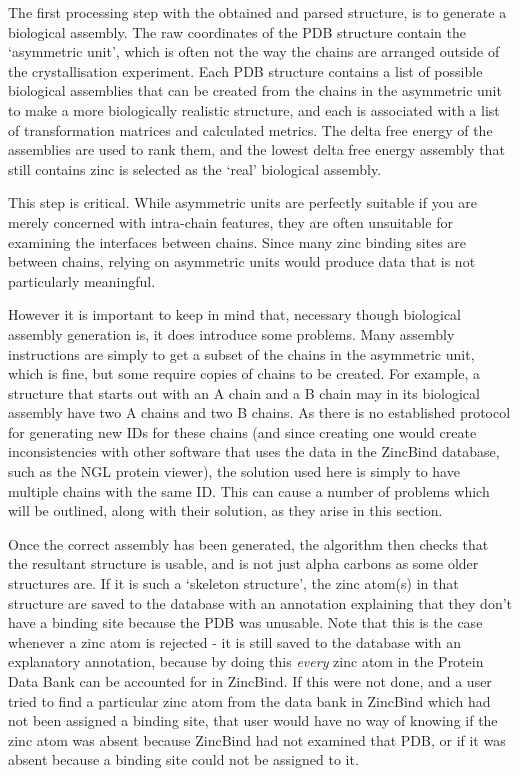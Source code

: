 The first processing step with the obtained and parsed structure, is to generate a biological assembly. The raw coordinates of the PDB structure contain the `asymmetric unit', which is often not the way the chains are arranged outside of the crystallisation experiment. Each PDB structure contains a list of possible biological assemblies that can be created from the chains in the asymmetric unit to make a more biologically realistic structure, and each is associated with a list of transformation matrices and calculated metrics. The delta free energy of the assemblies are used to rank them, and the lowest delta free energy assembly that still contains zinc is selected as the `real' biological assembly.

This step is critical. While asymmetric units are perfectly suitable if you are merely concerned with intra-chain features, they are often unsuitable for examining the interfaces between chains. Since many zinc binding sites are between chains, relying on asymmetric units would produce data that is not particularly meaningful.

However it is important to keep in mind that, necessary though biological assembly generation is, it does introduce some problems. Many assembly instructions are simply to get a subset of the chains in the asymmetric unit, which is fine, but some require copies of chains to be created. For example, a structure that starts out with an A chain and a B chain may in its biological assembly have two A chains and two B chains. As there is no established protocol for generating new IDs for these chains (and since creating one would create inconsistencies with other software that uses the data in the ZincBind database, such as the NGL protein viewer), the solution used here is simply to have multiple chains with the same ID. This can cause a number of problems which will be outlined, along with their solution, as they arise in this section.

Once the correct assembly has been generated, the algorithm then checks that the resultant structure is usable, and is not just alpha carbons as some older structures are. If it is such a `skeleton structure', the zinc atom(s) in that structure are saved to the database with an annotation explaining that they don't have a binding site because the PDB was unusable. Note that this is the case whenever a zinc atom is rejected - it is still saved to the database with an explanatory annotation, because by doing this \emph{every} zinc atom in the Protein Data Bank can be accounted for in ZincBind. If this were not done, and a user tried to find a particular zinc atom from the data bank in ZincBind which had not been assigned a binding site, that user would have no way of knowing if the zinc atom was absent because ZincBind had not examined that PDB, or if it was absent because a binding site could not be assigned to it.

